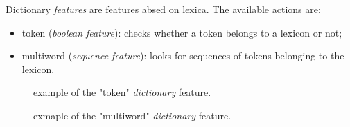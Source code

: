 \documentclass[manual-fr.tex]{subfiles}
\begin{document}
Dictionary \textit{features} are features absed on lexica. The available actions are:
\begin{itemize}
    \item token (\textit{boolean feature}): checks whether a token belongs to a lexicon or not;
    \item multiword (\textit{sequence feature}): looks for sequences of tokens belonging to the lexicon.
\end{itemize}

\begin{figure}[ht!]
\footnotesize
\begin{xml}
\end{xml}
\caption{example of the "token" \textit{dictionary} feature.}
\label{fig:feature-dictionary-token}
\end{figure}

\begin{figure}[ht!]
\footnotesize
\begin{xml}
\end{xml}
\caption{exmaple of the "multiword" \textit{dictionary} feature.}
\label{fig:feature-dictionary-multiword}
\end{figure}
\end{document}
